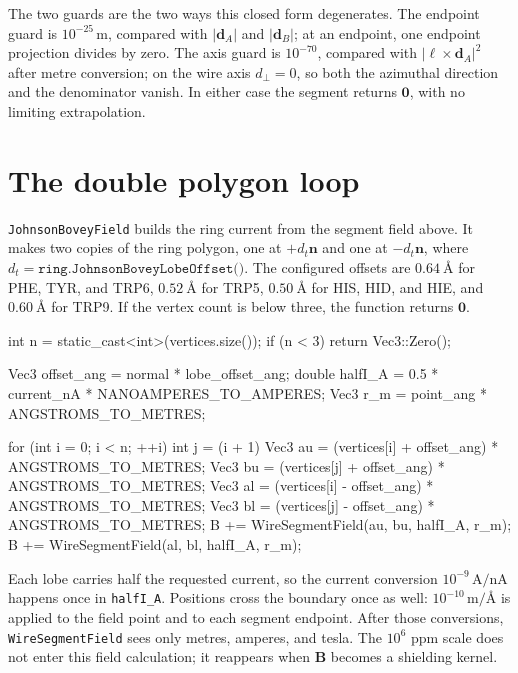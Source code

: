 \documentclass[11pt]{article}
\newcommand{\code}[1]{\texttt{#1}}
\begin{document}
The two guards are the two ways this closed form degenerates. The endpoint
guard is \(10^{-25}\,\si{\metre}\), compared with \(|\bm d_A|\) and
\(|\bm d_B|\); at an endpoint, one endpoint projection divides by zero. The
axis guard is \(10^{-70}\), compared with \(|\bm\ell\times\bm d_A|^2\) after
metre conversion; on the wire axis \(d_\perp=0\), so both the azimuthal
direction and the denominator vanish. In either case the segment returns
\(\bm0\), with no limiting extrapolation.

\section{The double polygon loop}

\code{JohnsonBoveyField} builds the ring current from the segment field above.
It makes two copies of the ring polygon, one at \(+d_t\bm n\) and one at
\(-d_t\bm n\), where \(d_t=\code{ring.JohnsonBoveyLobeOffset()}\). The configured
offsets are \(\SI{0.64}{\angstrom}\) for PHE, TYR, and TRP6,
\(\SI{0.52}{\angstrom}\) for TRP5, \(\SI{0.50}{\angstrom}\) for HIS, HID, and
HIE, and \(\SI{0.60}{\angstrom}\) for TRP9. If the vertex count is below three,
the function returns \(\bm0\).

\begin{codebox}
int n = static_cast<int>(vertices.size());
if (n < 3) return Vec3::Zero();

Vec3 offset_ang = normal * lobe_offset_ang;
double halfI_A = 0.5 * current_nA * NANOAMPERES_TO_AMPERES;
Vec3 r_m = point_ang * ANGSTROMS_TO_METRES;

for (int i = 0; i < n; ++i) {
    int j = (i + 1) %
    Vec3 au = (vertices[i] + offset_ang) * ANGSTROMS_TO_METRES;
    Vec3 bu = (vertices[j] + offset_ang) * ANGSTROMS_TO_METRES;
    Vec3 al = (vertices[i] - offset_ang) * ANGSTROMS_TO_METRES;
    Vec3 bl = (vertices[j] - offset_ang) * ANGSTROMS_TO_METRES;
    B += WireSegmentField(au, bu, halfI_A, r_m);
    B += WireSegmentField(al, bl, halfI_A, r_m);
}
\end{codebox}

Each lobe carries half the requested current, so the current conversion
\(10^{-9}\,\si{\ampere}/\si{\nano\ampere}\) happens once in
\code{halfI\_A}. Positions cross the boundary once as well:
\(10^{-10}\,\si{\metre}/\si{\angstrom}\) is applied to the field point and to
each segment endpoint. After those conversions, \code{WireSegmentField} sees
only metres, amperes, and tesla. The \(10^6\) ppm scale does not enter this
field calculation; it reappears when \(\bm B\) becomes a shielding kernel.
\end{document}
